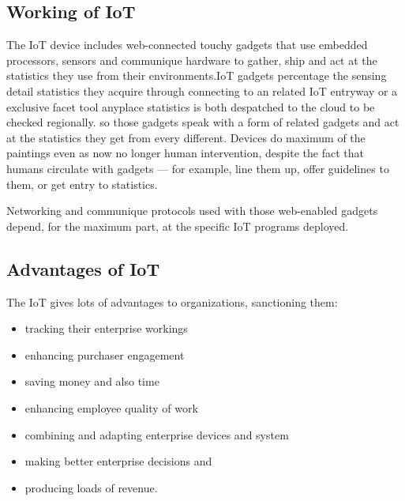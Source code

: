 \documentclass[12pt,a4paper]{article}
\begin{document}
\subsection{Working of IoT}
\hspace{0.5cm} The IoT device includes web-connected touchy gadgets that use embedded processors, sensors and communique hardware to gather, ship and act at the statistics they use from
their environments.IoT gadgets percentage the sensing detail statistics they acquire through connecting
to an related IoT entryway or a exclusive facet tool anyplace statistics is both despatched to
the cloud to be checked regionally. so those gadgets speak with a
form of related gadgets and act at the statistics they get from every different. Devices do maximum of
the paintings even as now no longer human intervention, despite the fact that humans circulate with gadgets — for example, line
them up, offer guidelines to them, or get entry to statistics.

Networking and communique protocols used with those web-enabled gadgets
depend, for the maximum part, at the specific IoT programs deployed.

\vspace{0.1in}
\subsection{Advantages of IoT}
\hspace{0.5cm}The IoT gives lots of advantages to organizations, sanctioning them:
\begin{itemize}
	\item tracking their enterprise workings
	\item enhancing purchaser engagement
	\item saving money and also time
	\item  enhancing employee quality of work
	\item combining and adapting enterprise devices and system 
	\item making better enterprise decisions and
	\item producing loads of revenue.
\end{itemize}
\end{document}

